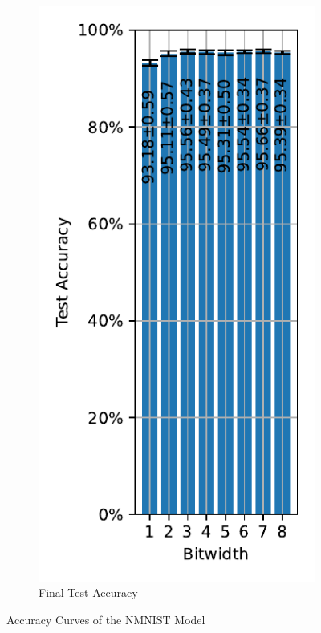 \begin{figure}[H]
\begin{subfigure}[H]{0.3\textwidth}
                \includegraphics[width=\textwidth]{../standard/NMNIST/plots/nmnist_final_acc.pdf}
                \caption{Final Test Accuracy}
            \end{subfigure}
            \caption{Accuracy Curves of the NMNIST Model}
        \end{figure}

